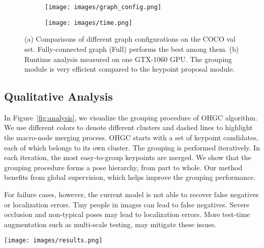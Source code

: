 \documentclass[runningheads]{llncs}
\begin{document}
	\begin{figure}[t]
		\centering
		\begin{subfigure}[b]{0.5\textwidth}
			\begin{minipage}[t]{1\textwidth}
				\centering
				\texttt{[image: images/graph\_config.png]}
				\caption{}
				\label{fig:graph_config}
			\end{minipage}
		\end{subfigure}
		\begin{subfigure}[b]{0.33\textwidth}
			\begin{minipage}[t]{1\textwidth}
				\centering
				\texttt{[image: images/time.png]}
				\caption{}
				\label{fig:time}
			\end{minipage}
		\end{subfigure}
		\caption{(a) Comparisons of different graph configurations on the COCO val set. Fully-connected graph (Full) performs the best among them. (b) Runtime analysis measured on one GTX-1060 GPU. The grouping module is very efficient compared to the keypoint proposal module.}
	\end{figure}
	
	
	\subsection{Qualitative Analysis}
	In Figure~\ref{fig:analysis}, we visualize the grouping procedure of OHGC algorithm. We use different colors to denote different clusters and dashed lines to highlight the macro-node merging process. OHGC starts with a set of keypoint candidates, each of which belongs to its own cluster. The grouping is performed iteratively. In each iteration, the most easy-to-group keypoints are merged. We show that the grouping procedure forms a pose hierarchy, from part to whole. Our method benefits from global supervision, which helps improve the grouping performance. 
	
	For failure cases, however, the current model is not able to recover false negatives or localization errors. Tiny people in images can lead to false negatives. Severe occlusion and non-typical poses may lead to localization errors. More test-time augmentation such as multi-scale testing, may mitigate these issues.
	
	\begin{figure*}[t]
		\begin{center}
			\texttt{[image: images/results.png]}
		\end{center}
		\caption{The grouping process visualization. We show the grouped keypoint clusters in each iteration. Different colors are used to indicate different clusters. }
		\label{fig:analysis}
	\end{figure*}
	
\end{document}
